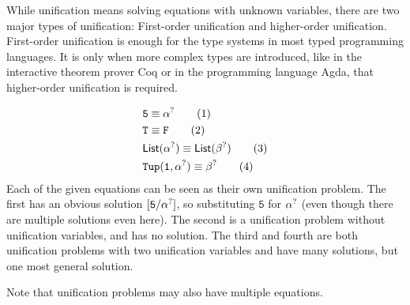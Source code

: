 \documentclass[twoside,12pt,a4paper]{article}
\begin{document}
While unification means solving equations with unknown variables, there are two major types of unification: First-order unification and higher-order unification.
First-order unification is enough for the type systems in most typed programming languages. It is only when more complex types are introduced, 
like in the interactive theorem prover Coq or in the programming language Agda, that higher-order unification is required.

\begin{example}
    \begin{align*}
        &\mathtt{5} \equiv \alpha^?\tag{1}\\
        &\mathtt{T \equiv F}\tag{2}\\
        &\mathsf{List(\alpha^?)\equiv List(\beta^?)}\tag{3}\\
        &\mathtt{Tup(1,\alpha^?)}\equiv \beta^? \tag{4}
    \end{align*}
    Each of the given equations can be seen as their own unification problem.
    The first has an obvious solution $[\mathtt{5/\alpha^?}]$, so substituting $\mathtt{5}$ for $\alpha^?$ (even though there are multiple solutions even here).
    The second is a unification problem without unification variables, and has no solution.
    The third and fourth are both unification problems with two unification variables and have many solutions, but one most general solution.
\end{example}
Note that unification problems may also have multiple equations.
\end{document}
